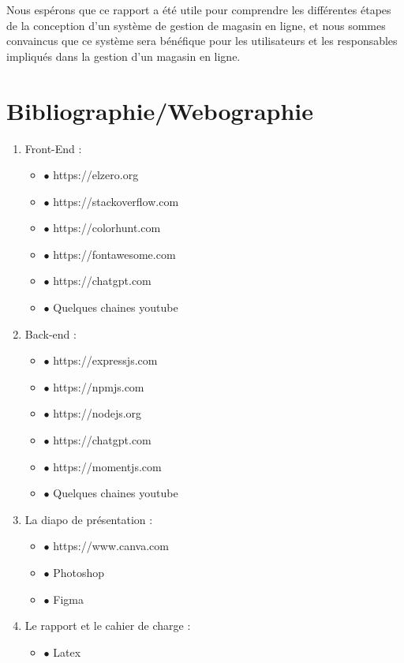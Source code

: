 \documentclass[a4paper,12pt,oneside]{article}
\begin{document}
{{Nous espérons que ce rapport a été utile pour comprendre les différentes étapes de la conception d'un système de gestion de magasin en ligne, et nous sommes convaincus que ce système sera bénéfique pour les utilisateurs et les responsables impliqués dans la gestion d'un magasin en ligne.

}
\section{Bibliographie/Webographie}
{\fontsize{15}{20}\selectfont
\begin{enumerate}
  	\item Front-End :
  		\begin{itemize}
        \item[] $\bullet$ https://elzero.org
    		\item[] $\bullet$ https://stackoverflow.com
    		\item[] $\bullet$ https://colorhunt.com
    		\item[] $\bullet$ https://fontawesome.com
    		\item[] $\bullet$ https://chatgpt.com
        \item[] $\bullet$ Quelques chaines youtube     
    		\end{itemize} 
 	\item Back-end : 
 		\begin{itemize}
        \item[] $\bullet$ https://expressjs.com
    		\item[] $\bullet$ https://npmjs.com
    		\item[] $\bullet$ https://nodejs.org
    		\item[] $\bullet$ https://chatgpt.com
    		\item[] $\bullet$ https://momentjs.com
        \item[] $\bullet$ Quelques chaines youtube     
    		\end{itemize} 
  	\item La diapo de présentation : 
  	 	\begin{itemize}
        \item[] $\bullet$ https://www.canva.com
        \item[] $\bullet$ Photoshop
        \item[] $\bullet$ Figma     
    		\end{itemize} 
	\item Le rapport et le cahier de charge :	
		\begin{itemize}
        \item[] $\bullet$ Latex
        \end{itemize}
\end{enumerate}

}}
\end{document}
